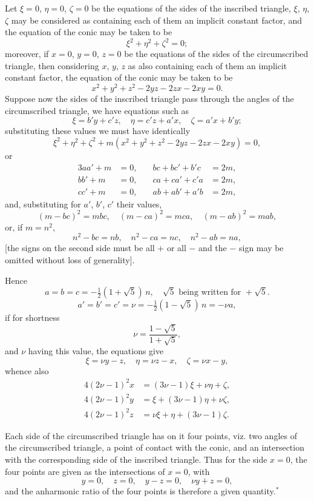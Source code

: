 \documentclass[11pt,a4paper]{article}
\theoremstyle{plain}
\begin{document}
Let $\xi = 0$, $\eta = 0$, $\zeta = 0$ be the equations of the sides of the inscribed triangle, $\xi$, $\eta$, $\zeta$ may be considered as containing each of them an implicit constant factor, and the equation of the conic may be taken to be
\[
\xi^2 + \eta^2 + \zeta^2 = 0;
\]
moreover, if $x = 0$, $y = 0$, $z = 0$ be the equations of the sides of the circumscribed triangle, then considering $x$, $y$, $z$ as also containing each of them an implicit constant factor, the equation of the conic may be taken to be
\[
x^2 + y^2 + z^2 - 2yz - 2zx - 2xy = 0.
\]
Suppose now the sides of the inscribed triangle pass through the angles of the circumscribed triangle, we have equations such as
\[
\xi = b'y + c'z,\quad \eta = c'z + a'x,\quad \zeta = a'x + b'y;
\]
substituting these values we must have identically
\[
\xi^2 + \eta^2 + \zeta^2 + m(x^2 + y^2 + z^2 - 2yz - 2zx - 2xy) = 0,
\]
or
\begin{alignat*}{3}
aa' + m &= 0, &\quad bc + bc' + b'c &= 2m,\\
bb' + m &= 0, &\quad ca + ca' + c'a &= 2m,\\
cc' + m &= 0, &\quad ab + ab' + a'b &= 2m,
\end{alignat*}
and, substituting for $a'$, $b'$, $c'$ their values,
\[
(m - bc)^2 = mbc,\quad (m - ca)^2 = mca,\quad (m - ab)^2 = mab,
\]
or, if $m = n^2$,
\[
n^2 - bc = nb,\quad n^2 - ca = nc,\quad n^2 - ab = na,
\]
[the signs on the second side must be all $+$ or all $-$ and the $-$ sign may be omitted without loss of generality].

Hence
\[
a = b = c = -\tfrac{1}{2}(1 + \sqrt{5})\,n,\quad \sqrt{5}\text{ being written for }+\sqrt{5}.
\]
\[
a' = b' = c' = \nu = -\tfrac{1}{2}(1 - \sqrt{5})\,n = -\nu a,
\]
if for shortness
\[
\nu = \frac{1 - \sqrt{5}}{1 + \sqrt{5}},
\]
and $\nu$ having this value, the equations give
\[
\xi = \nu y - z,\quad \eta = \nu z - x,\quad \zeta = \nu x - y,
\]
whence also
\begin{align*}
4(2\nu - 1)^2x &= (3\nu - 1)\xi + \nu\eta + \zeta,\\
4(2\nu - 1)^2y &= \xi + (3\nu - 1)\eta + \nu\zeta,\\
4(2\nu - 1)^2z &= \nu\xi + \eta + (3\nu - 1)\zeta.
\end{align*}

Each side of the circumscribed triangle has on it four points, viz. two angles of the circumscribed triangle, a point of contact with the conic, and an intersection with the corresponding side of the inscribed triangle. Thus for the side $x = 0$, the four points are given as the intersections of $x = 0$, with
\[
y = 0,\quad z = 0,\quad y - z = 0,\quad \nu y + z = 0,
\]
and the anharmonic ratio of the four points is therefore a given quantity.$^*$
\end{document}
